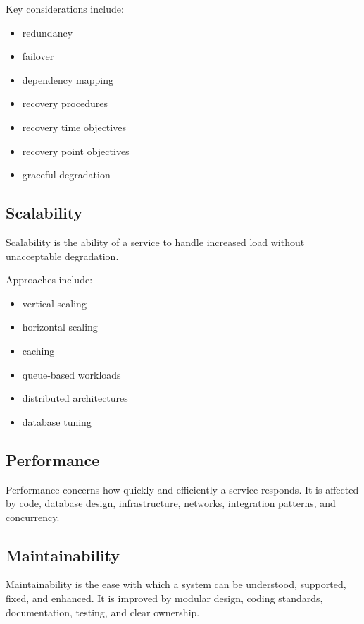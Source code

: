 \documentclass[
  british,
  letterpaper,
  DIV=11,
  numbers=noendperiod]{scrartcl}
\providecommand{\tightlist}{%
  \setlength{\itemsep}{0pt}\setlength{\parskip}{0pt}}
\begin{document}
Key considerations include:

\begin{itemize}
\tightlist
\item
  redundancy
\item
  failover
\item
  dependency mapping
\item
  recovery procedures
\item
  recovery time objectives
\item
  recovery point objectives
\item
  graceful degradation
\end{itemize}

\subsection{Scalability}\label{scalability}

Scalability is the ability of a service to handle increased load without
unacceptable degradation.

Approaches include:

\begin{itemize}
\tightlist
\item
  vertical scaling
\item
  horizontal scaling
\item
  caching
\item
  queue-based workloads
\item
  distributed architectures
\item
  database tuning
\end{itemize}

\subsection{Performance}\label{performance}

Performance concerns how quickly and efficiently a service responds. It
is affected by code, database design, infrastructure, networks,
integration patterns, and concurrency.

\subsection{Maintainability}\label{maintainability}

Maintainability is the ease with which a system can be understood,
supported, fixed, and enhanced. It is improved by modular design, coding
standards, documentation, testing, and clear ownership.
\end{document}
